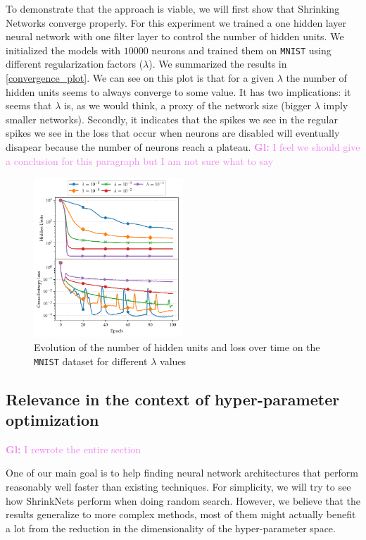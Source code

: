 \documentclass[sigconf]{acmart}
\newcommand{\gl}[1]{\textcolor{violet}{{\bf Gl:} #1}}
\begin{document}
To demonstrate that the approach is viable, we will first show that Shrinking
Networks converge properly. For this experiment we trained a one hidden layer
neural network with one filter layer to control the number of hidden units. We
initialized the models with $10000$ neurons and trained them on \texttt{MNIST}
using different regularization factors ($\lambda$). We summarized the results
in \autoref{convergence_plot}. We can see on this plot is that
for a given $\lambda$ the number of hidden units seems to always converge to
some value. It has two implications: it seems that $\lambda$ is, as we would think,
a proxy of the network size (bigger $\lambda$ imply smaller networks). Secondly,
it indicates that the spikes we see in the regular spikes we see in the loss that occur when neurons are disabled will eventually disapear because the number of neurons reach a plateau. \gl{I feel we should give a conclusion for this paragraph but
I am not sure what to say}
\begin{figure}
\begin{center}
\includegraphics[width=0.5\textwidth]{convergence}
\caption{Evolution of the number of hidden units and loss over time on the \texttt{MNIST} dataset for different $\lambda$ values \label{convergence_plot}}
\end{center}
\end{figure}


\subsection{Relevance in the context of hyper-parameter optimization}

\gl{I rewrote the entire section}

One of our main goal is to help finding neural network architectures that
perform reasonably well faster than existing techniques. For simplicity,
we will try to see how ShrinkNets perform when doing random search. However,
we believe that the results generalize to more complex methods, most of them
might actually benefit a lot from the reduction in the dimensionality of the
hyper-parameter space.
\end{document}
